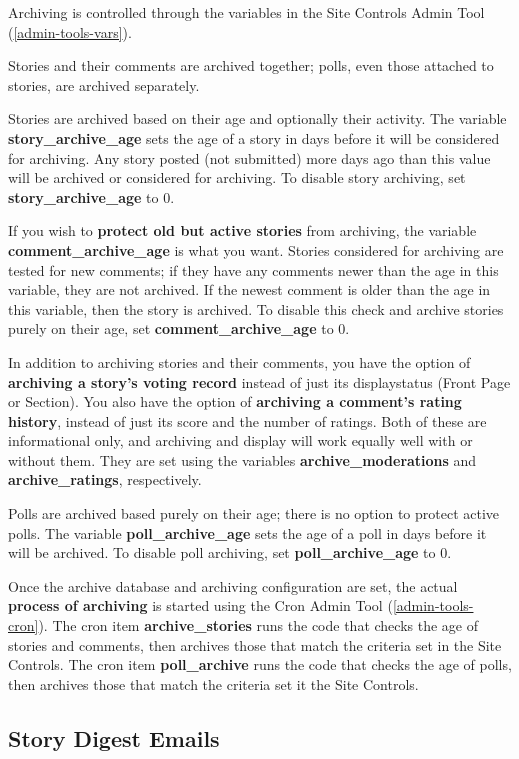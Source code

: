 Archiving is controlled through the variables in the Site Controls Admin Tool (\ref{admin-tools-vars}).

Stories and their comments are archived together; polls, even those attached to stories, are archived separately.

Stories are archived based on their age and optionally their activity.  The variable {\bf story\_archive\_age} sets the age of a story in days before it will be considered for archiving.  Any story posted (not submitted) more days ago than this value will be archived or considered for archiving.  To disable story archiving, set {\bf story\_archive\_age} to 0.

If you wish to {\bf protect old but active stories} from archiving, the variable {\bf comment\_archive\_age} is what you want.  Stories considered for archiving are tested for new comments; if they have any comments newer than the age in this variable, they are not archived.  If the newest comment is older than the age in this variable, then the story is archived.  To disable this check and archive stories purely on their age, set {\bf comment\_archive\_age} to 0.

In addition to archiving stories and their comments, you have the option of {\bf archiving a story's voting record} instead of just its displaystatus (Front Page or Section).  You also have the option of {\bf archiving a comment's rating history}, instead of just its score and the number of ratings.  Both of these are informational only, and archiving and display will work equally well with or without them.  They are set using the variables {\bf archive\_moderations} and {\bf archive\_ratings}, respectively.

Polls are archived based purely on their age; there is no option to protect active polls.  The variable {\bf poll\_archive\_age} sets the age of a poll in days before it will be archived.  To disable poll archiving, set {\bf poll\_archive\_age} to 0.

Once the archive database and archiving configuration are set, the actual {\bf process of archiving} is started using the Cron Admin Tool (\ref{admin-tools-cron}).  The cron item {\bf archive\_stories} runs the code that checks the age of stories and comments, then archives those that match the criteria set in the Site Controls.  The cron item {\bf poll\_archive} runs the code that checks the age of polls, then archives those that match the criteria set it the Site Controls.

\subsection{Story Digest Emails}
\label{features-digest}

